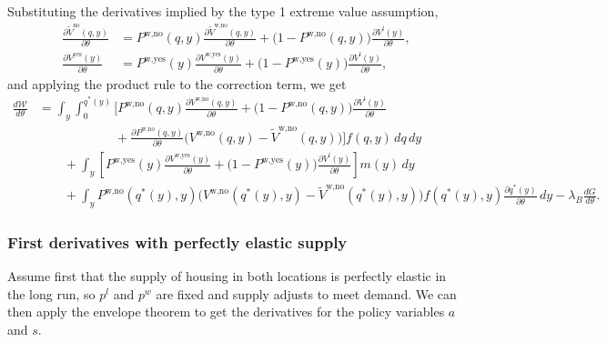 \documentclass{article}
\begin{document}
Substituting the derivatives implied by the type 1 extreme value assumption,
\begin{align}
\frac{\partial \tilde V^{\text{no}}(q,y)}{\partial\theta}
&=
P^{\text{w,no}}(q,y)\frac{\partial \tilde V^{\text{w,no}}(q,y)}{\partial\theta}
+
\big(1-P^{\text{w,no}}(q,y)\big)\frac{\partial V^l(y)}{\partial\theta},
\\
\frac{\partial V^{\text{yes}}(y)}{\partial\theta}
&=
P^{\text{w,yes}}(y)\frac{\partial V^{\text{w,yes}}(y)}{\partial\theta}
+
\big(1-P^{\text{w,yes}}(y)\big)\frac{\partial V^l(y)}{\partial\theta},
\end{align}
and applying the product rule to the correction term, we get
\begin{align}
\frac{d\mathcal W}{d\theta}
&=
\int_y\int_{0}^{q^{*}(y)}
\Bigg[
P^{\text{w,no}}(q,y)\frac{\partial V^{\text{w,no}}(q,y)}{\partial\theta}
+
\big(1-P^{\text{w,no}}(q,y)\big)\frac{\partial V^l(y)}{\partial\theta}
\nonumber\\
&\qquad\qquad\qquad
+
\frac{\partial P^{\text{w,no}}(q,y)}{\partial\theta}
\Big(V^{\text{w,no}}(q,y)-\tilde V^{\text{w,no}}(q,y)\Big)
\Bigg]
f(q,y)\,dq\,dy
\nonumber\\
&\qquad
+
\int_y
\left[
P^{\text{w,yes}}(y)\frac{\partial V^{\text{w,yes}}(y)}{\partial \theta}
+
\big(1-P^{\text{w,yes}}(y)\big)\frac{\partial V^l(y)}{\partial \theta}
\right]
m(y)\,dy
\nonumber\\
&\qquad
+
\int_y
P^{\text{w,no}}(q^{*}(y),y)
\Big(V^{\text{w,no}}(q^{*}(y),y)-\tilde V^{\text{w,no}}(q^{*}(y),y)\Big)
f(q^{*}(y),y)\frac{\partial q^{*}(y)}{\partial \theta}\,dy
-\lambda_B\frac{dG}{d\theta}.
\end{align}

\subsubsection{First derivatives with perfectly elastic supply}

Assume first that the supply of housing in both locations is perfectly elastic in the long run, so $p^l$ and $p^w$ are fixed and supply adjusts to meet demand. We can then apply the envelope theorem to get the derivatives for the policy variables $a$ and $s$.
\end{document}
